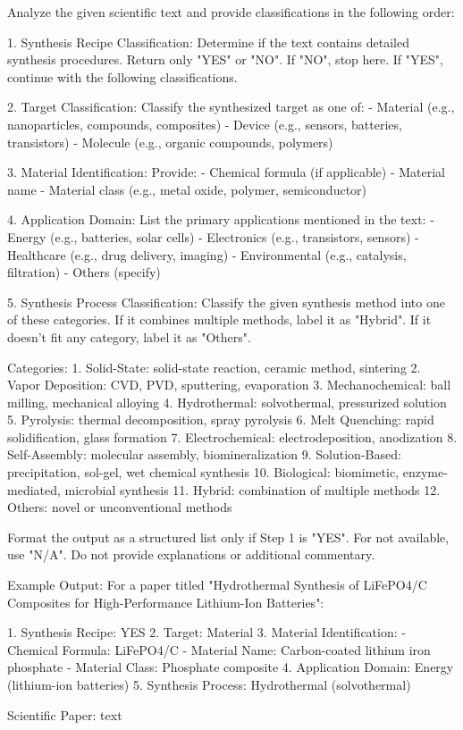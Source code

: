 Analyze the given scientific text and provide classifications in the following order:

1. Synthesis Recipe Classification:
Determine if the text contains detailed synthesis procedures.
Return only "YES" or "NO".
If "NO", stop here. If "YES", continue with the following classifications.

2. Target Classification:
Classify the synthesized target as one of:
- Material (e.g., nanoparticles, compounds, composites)
- Device (e.g., sensors, batteries, transistors)
- Molecule (e.g., organic compounds, polymers)

3. Material Identification:
Provide:
- Chemical formula (if applicable)
- Material name
- Material class (e.g., metal oxide, polymer, semiconductor)

4. Application Domain:
List the primary applications mentioned in the text:
- Energy (e.g., batteries, solar cells)
- Electronics (e.g., transistors, sensors)
- Healthcare (e.g., drug delivery, imaging)
- Environmental (e.g., catalysis, filtration)
- Others (specify)

5. Synthesis Process Classification:
Classify the given synthesis method into one of these categories. If it combines multiple methods, label it as "Hybrid". If it doesn't fit any category, label it as "Others".

Categories:
1. Solid-State: solid-state reaction, ceramic method, sintering
2. Vapor Deposition: CVD, PVD, sputtering, evaporation
3. Mechanochemical: ball milling, mechanical alloying
4. Hydrothermal: solvothermal, pressurized solution
5. Pyrolysis: thermal decomposition, spray pyrolysis
6. Melt Quenching: rapid solidification, glass formation
7. Electrochemical: electrodeposition, anodization
8. Self-Assembly: molecular assembly, biomineralization
9. Solution-Based: precipitation, sol-gel, wet chemical synthesis
10. Biological: biomimetic, enzyme-mediated, microbial synthesis
11. Hybrid: combination of multiple methods
12. Others: novel or unconventional methods


Format the output as a structured list only if Step 1 is "YES".
For not available, use "N/A".
Do not provide explanations or additional commentary.

Example Output:
For a paper titled "Hydrothermal Synthesis of LiFePO4/C Composites for High-Performance Lithium-Ion Batteries":

1. Synthesis Recipe: YES
2. Target: Material
3. Material Identification:
- Chemical Formula: LiFePO4/C
- Material Name: Carbon-coated lithium iron phosphate
- Material Class: Phosphate composite
4. Application Domain: Energy (lithium-ion batteries)
5. Synthesis Process: Hydrothermal (solvothermal)


Scientific Paper:
{text}